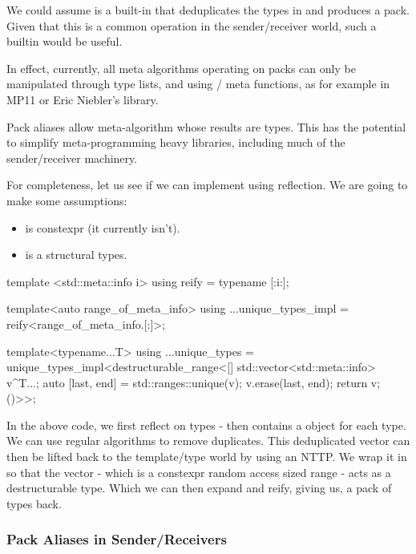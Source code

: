 \documentclass{wg21}
\begin{document}
We could assume  is a built-in that deduplicates the types in  and produces a pack.
Given that this is a common operation in the sender/receiver world, such a builtin would be useful.

In effect, currently, all meta algorithms operating on packs can only be manipulated through type lists,
and using / meta functions, as for example in MP11 or Eric Niebler's  library.

Pack aliases allow meta-algorithm whose results are types.
This has the potential to simplify meta-programming heavy libraries, including much of the sender/receiver machinery.


For completeness, let us see if we can implement  using reflection.
We are going to make some assumptions:

\begin{itemize}
    \item {} is constexpr (it currently isn't).
    \item {} is a structural types.
\end{itemize}

\begin{colorblock}
template <std::meta::info i>
using reify =  typename [:i:];

template<auto range_of_meta_info>
using ...unique_types_impl = reify<range_of_meta_info.[:]>;

template<typename...T>
using ...unique_types =
    unique_types_impl<destructurable_range<[] {
                std::vector<std::meta::info> v{^T...};
                auto [last, end] = std::ranges::unique(v);
                v.erase(last, end);
                return v;
            }()>{}>;
\end{colorblock}

In the above code, we first reflect on types -  then contains a  object for each type.
We can use regular algorithms to remove duplicates.
This deduplicated vector can then be lifted back to the template/type world by using an NTTP. We wrap it in 
so that the vector - which is a constexpr random access sized range - acts as a destructurable type.
Which we can then expand and reify, giving us, a pack of types back.


\subsubsection{Pack Aliases in Sender/Receivers}
\end{document}
